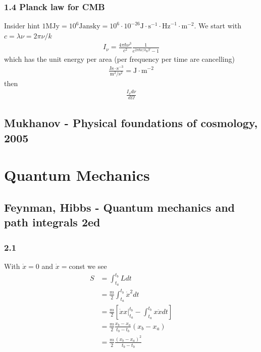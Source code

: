 \documentclass[10pt,a4paper]{article}
\theoremstyle{definition}
\begin{document}
\subsubsection{1.4 Planck law for CMB}
Insider hint $1\text{MJy} =10^6\text{Jansky}=10^6\cdot10^{-26}\text{J}\cdot\text{s}^{-1}\cdot\text{Hz}^{-1}\cdot\text{m}^{-2}$. We start with $c=\lambda\nu=2\pi\nu/k$
\begin{align}
I_\nu=\frac{4\pi\hbar\nu^3}{c^2}\frac{1}{e^{2\pi\hbar\nu/k_\text{B}T}-1}
\end{align}
which has the unit energy per area (per frequency per time are cancelling)
\begin{align}
\frac{\text{Js}\cdot \text{s}^{-3}}{\text{m}^2/\text{s}^2}=\text{J}\cdot\text{m}^{-2}
\end{align}
then
\begin{align}
\frac{I_\nu d\nu}{d\Omega}
\end{align}

\subsection{{\sc Mukhanov} - Physical foundations of cosmology, 2005}

\section{Quantum Mechanics}
\subsection{{\sc Feynman, Hibbs} - Quantum mechanics and path integrals 2ed}
\subsubsection{2.1}
With $\dot x=0$ and $\dot x=$const we see
\begin{align}
    S&=\int_{t_a}^{t_b}L dt\\
    &=\frac{m}{2}\int_{t_a}^{t_b}\dot x^2 dt\\
    &=\frac{m}{2}\left[\left.\dot x x\right|_{t_a}^{t_b}-\int_{t_a}^{t_b} x\ddot xdt\right]\\
    &=\frac{m}{2}\frac{x_b-x_a}{t_b-t_b}(x_b-x_a)\\
     &=\frac{m}{2}\frac{(x_b-x_a)^2}{t_b-t_b}
\end{align}
\end{document}
